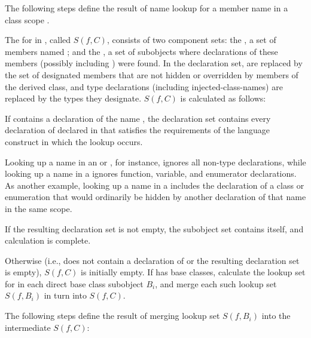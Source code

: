 \pnum
The following steps define the result of name lookup for a member name
 in a class scope .

\pnum
The  for  in , called $S(f,C)$,
consists of two component sets: the , a set of
members named ; and the , a set of
subobjects where declarations of these members (possibly including
) were found. In the declaration set,
 are replaced by the
set of designated members that are not hidden or overridden by members of the
derived class,
and type declarations (including injected-class-names) are
replaced by the types they designate. $S(f,C)$ is calculated as follows:

\pnum
If  contains a declaration of the name , the
declaration set contains every declaration of  declared in
 that satisfies the requirements of the language construct in
which the lookup occurs.
\begin{note}
Looking up a name in an
 or
, for instance,
ignores all non-type declarations, while looking up a name in a
 ignores
function, variable, and enumerator declarations. As another example,
looking up a name in a
 includes the
declaration of a class or enumeration that would ordinarily be hidden by
another declaration of that name in the same scope.
\end{note}
If the resulting declaration set is not empty, the subobject set
contains  itself, and calculation is complete.

\pnum
Otherwise (i.e.,  does not contain a declaration of 
or the resulting declaration set is empty), $S(f,C)$ is initially empty.
If  has base classes, calculate the lookup set for  in
each direct base class subobject $B_i$, and merge each such lookup set
$S(f,B_i)$ in turn into $S(f,C)$.

\pnum
The following steps define the result of merging lookup set $S(f,B_i)$
into the intermediate $S(f,C)$:


